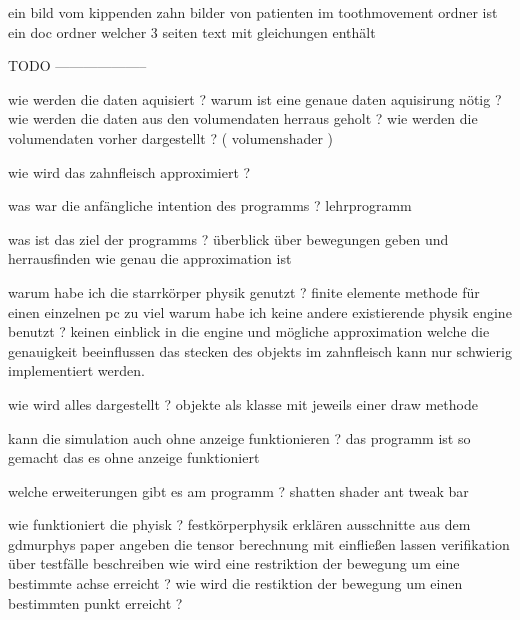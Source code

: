 
ein bild vom kippenden zahn
bilder von patienten 
im toothmovement ordner ist ein doc ordner welcher 3 seiten text mit gleichungen enthält

TODO --------------------

wie werden die daten aquisiert ?
    warum ist eine genaue daten aquisirung nötig ?
    wie werden die daten aus den volumendaten herraus geholt ?
    wie werden die volumendaten vorher dargestellt ? ( volumenshader )

wie wird das zahnfleisch approximiert ?

was war die anfängliche intention des programms ? 
    lehrprogramm

was ist das ziel der programms ? 
    überblick über bewegungen geben und herrausfinden wie genau die approximation ist 

warum habe ich die starrkörper physik genutzt ?
    finite elemente methode für einen einzelnen pc zu viel 
    warum habe ich keine andere existierende physik engine benutzt ?
        keinen einblick in die engine und mögliche approximation welche die genauigkeit beeinflussen 
        das stecken des objekts im zahnfleisch kann nur schwierig implementiert werden.

wie wird alles dargestellt ?
    objekte als klasse mit jeweils einer draw methode

kann die simulation auch ohne anzeige funktionieren ?
    das programm ist so gemacht das es ohne anzeige funktioniert

welche erweiterungen gibt es am programm ? 
    shatten shader
    ant tweak bar

wie funktioniert die phyisk ?
    festkörperphysik erklären
    ausschnitte aus dem gdmurphys paper angeben
    die tensor berechnung mit einfließen lassen
    verifikation über testfälle beschreiben
    wie wird eine restriktion der bewegung um eine bestimmte achse erreicht ?
    wie wird die restiktion der bewegung um einen bestimmten punkt erreicht ?


